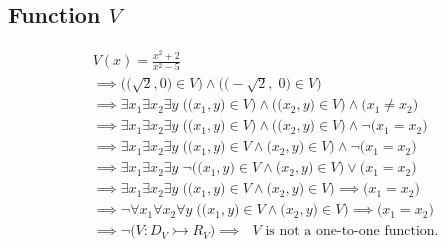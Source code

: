 \documentclass[12pt, letterpaper]{article}
\begin{document}
        \subsection{Function \(V\) }
        \vspace{-18pt}
        \begin{align*}
            &V(x) = \frac{x^2 + 2}{x^2 - 5} \\
                & \implies \Big(\big(\sqrt{2}, 0\big) \in V\Big) \wedge \Big(\big(-\sqrt{2}, \; 0\big) \in V\Big) \\ 
            & \implies \exists x_1 \exists x_2 \exists y \; \Big( \big(x_1, y\big) \in V \Big) \wedge
                                                   \Big( \big(x_2, y\big) \in V \Big) \wedge
                                                   \Big( x_1 \neq x_2 \Big) \\
            & \implies \exists x_1 \exists x_2 \exists y \; \Big( \big(x_1, y\big) \in V \Big) \wedge
                                                   \Big( \big(x_2, y\big) \in V \Big) \wedge
                                                   \neg\Big( x_1 = x_2 \Big) \\
            & \implies \exists x_1 \exists x_2 \exists y \; \Big( \big(x_1, y\big) \in V \wedge
                                                   \big(x_2, y\big) \in V \Big) \wedge
                                                   \neg\Big( x_1 = x_2 \Big) \\
            & \implies \exists x_1 \exists x_2 \exists y \; \neg\Big( \big(x_1, y\big) \in V \wedge
                                                   \big(x_2, y\big) \in V \Big) \lor
                                                   \Big( x_1 = x_2 \Big) \\
            & \implies \exists x_1 \exists x_2 \exists y \; \Big( \big(x_1, y\big) \in V \wedge
                                                   \big(x_2, y\big) \in V \Big) \implies
                                                   \Big( x_1 = x_2 \Big) \\
            & \implies \neg\forall x_1 \forall x_2 \forall y \; \Big( \big(x_1, y\big) \in V \wedge
                                                   \big(x_2, y\big) \in V \Big) \implies
                                                   \Big( x_1 = x_2 \Big) \\
            & \implies \neg\Big( V : D_{V} \rightarrowtail R_{V} \Big)
              \implies \text{ \(V\) is not a one-to-one function.}
        \end{align*}
\end{document}
